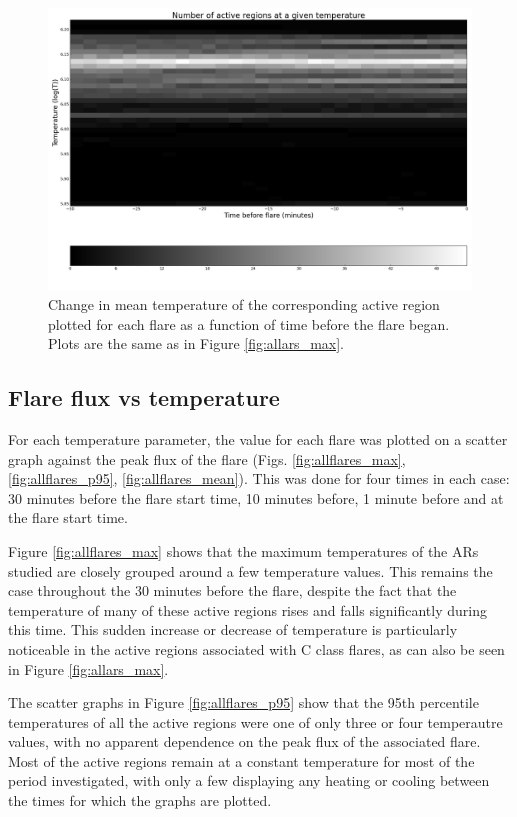 \documentclass[referee,a4paper,12pt]{swsc}
\begin{document}
\begin{linenumbers}
\begin{figure}
	\centering
		\includegraphics[width=\columnwidth]{tempplotsmean/allars_hist.png}
	\caption{Change in mean temperature of the corresponding active region plotted for each flare as a function of time before the flare began.
		Plots are the same as in Figure \ref{fig:allars_max}.}
	\label{fig:allars_mean}
\end{figure}

\subsection{Flare flux vs temperature}
For each temperature parameter, the value for each flare was plotted on a scatter graph against the peak flux of the flare (Figs. \ref{fig:allflares_max}, \ref{fig:allflares_p95}, \ref{fig:allflares_mean}).
This was done for four times in each case: 30 minutes before the flare start time, 10 minutes before, 1 minute before and at the flare start time.

Figure \ref{fig:allflares_max} shows that the maximum temperatures of the ARs studied are closely grouped around a few temperature values.
This remains the case throughout the 30 minutes before the flare, despite the fact that the temperature of many of these active regions rises and falls significantly during this time.
This sudden increase or decrease of temperature is particularly noticeable in the active regions associated with C class flares, as can also be seen in Figure \ref{fig:allars_max}.

The scatter graphs in Figure \ref{fig:allflares_p95} show that the 95th percentile temperatures of all the active regions were one of only three or four temperautre values, with no apparent dependence on the peak flux of the associated flare. Most of the active regions remain at a constant temperature for most of the period investigated, with only a few displaying any heating or cooling between the times for which the graphs are plotted.


\end{linenumbers}
\end{document}
